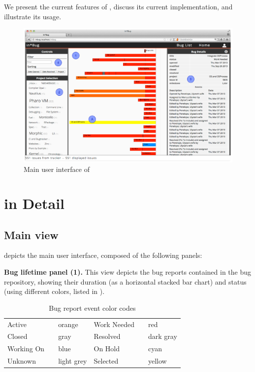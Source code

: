 We present the current features of \ib, discuss its current implementation, and illustrate its usage.


\begin{figure}[ht]
\centering
\includegraphics[width=\linewidth]{Images/visualize/inbug-list.pdf}
\caption{Main user interface of \ib}
\label{inbug}
\end{figure}

\section{\ib in Detail}\label{sec:visualize-details}

\subsection{Main view}\label{main-view}

 depicts the main user interface, composed of the following panels:

\textbf{Bug lifetime panel (1).} \label{bug-lifetime-panel} This view depicts the bug reports contained in the bug repository, showing their duration (as a horizontal stacked bar chart) and status (using different colors, listed in ).

\begin{table}[ht]
\center
\caption{Bug report event color codes}
\label{tab-colors}
\begin{tabular}{l p{0.1cm} l | l p{0.1cm} l } \hline
Active & \cellcolor{active} & orange & Work Needed & \cellcolor{work needed} & red \\
Closed & \cellcolor{closed} & gray & Resolved & \cellcolor{resolved} & dark gray \\
Working On & \cellcolor{working on} & blue & On Hold & \cellcolor{on hold} & cyan \\
Unknown & \cellcolor{unknown} & light grey & Selected & \cellcolor{yellow} & yellow \\ \hline
\end{tabular}
\end{table}

